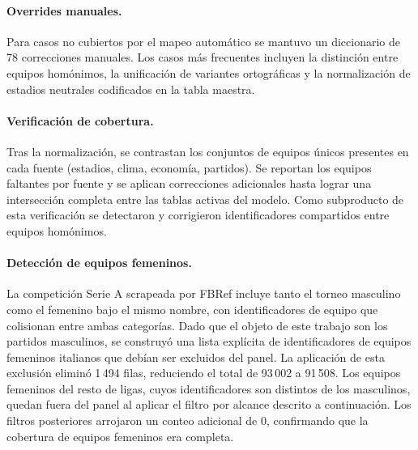 \paragraph{Overrides manuales.} Para casos no cubiertos por el mapeo autom\'atico se mantuvo un diccionario de 78 correcciones manuales. Los casos m\'as frecuentes incluyen la distinci\'on entre equipos hom\'onimos, la unificaci\'on de variantes ortogr\'aficas y la normalizaci\'on de estadios neutrales codificados en la tabla maestra.

\paragraph{Verificaci\'on de cobertura.} Tras la normalizaci\'on, se contrastan los conjuntos de equipos \'unicos presentes en cada fuente (estadios, clima, econom\'ia, partidos). Se reportan los equipos faltantes por fuente y se aplican correcciones adicionales hasta lograr una intersecci\'on completa entre las tablas activas del modelo. Como subproducto de esta verificaci\'on se detectaron y corrigieron identificadores compartidos entre equipos hom\'onimos.

\paragraph{Detecci\'on de equipos femeninos.} La competici\'on Serie A scrapeada por FBRef incluye tanto el torneo masculino como el femenino bajo el mismo nombre, con identificadores de equipo que colisionan entre ambas categor\'ias. Dado que el objeto de este trabajo son los partidos masculinos, se construy\'o una lista expl\'icita de identificadores de equipos femeninos italianos que deb\'ian ser excluidos del panel. La aplicaci\'on de esta exclusi\'on elimin\'o 1\,494 filas, reduciendo el total de 93\,002 a 91\,508. Los equipos femeninos del resto de ligas, cuyos identificadores son distintos de los masculinos, quedan fuera del panel al aplicar el filtro por alcance descrito a continuaci\'on. Los filtros posteriores arrojaron un conteo adicional de $0$, confirmando que la cobertura de equipos femeninos era completa.

